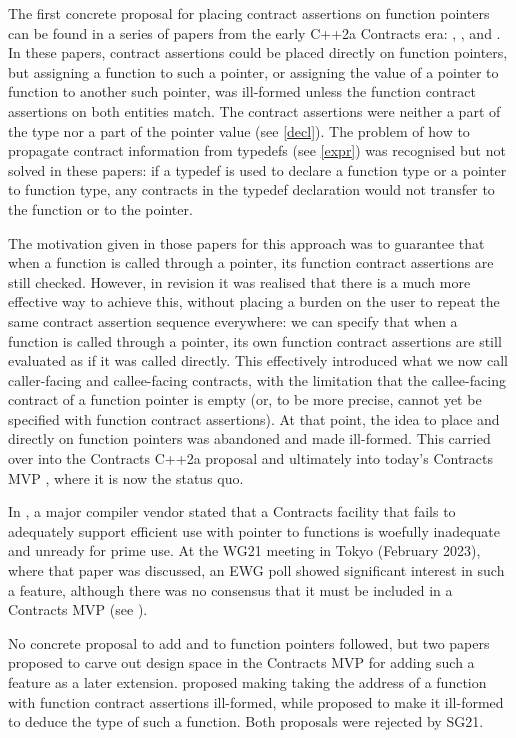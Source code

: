 The first concrete proposal for placing contract assertions on function pointers can be found in a series of papers from the early C++2a Contracts era: \cite{N4415}, \cite{P0287R0}, and \cite{P0380R0}. In these papers, contract assertions could be placed directly on function pointers, but assigning a function to such a pointer, or assigning the value of a pointer to function to another such pointer, was ill-formed unless the function contract assertions on both entities match. The contract assertions were neither a part of the type nor a part of the pointer value (see \ref{decl}). The problem of how to propagate contract information from typedefs (see \ref{expr}) was recognised but not solved in these papers:  if a typedef is used to declare a function type or a pointer to function type, any contracts in the typedef declaration would not transfer to the function or to the pointer.

The motivation given in those papers for this approach was to guarantee that when a function is called through a pointer, its function contract assertions are still checked. However, in revision \cite{P0380R1} it was realised that there is a much more effective way to achieve this, without placing a burden on the user to repeat the same contract assertion sequence everywhere: we can specify that when a function is called through a pointer, its own function contract assertions are still evaluated as if it was called directly. This effectively introduced what we now call caller-facing and callee-facing contracts, with the limitation that the callee-facing contract of a function pointer is empty (or, to be more precise, cannot yet be specified with function contract assertions). At that point, the idea to place  and  directly on function pointers was abandoned and made ill-formed. This carried over into the Contracts C++2a proposal \cite{P0542R5} and ultimately into today's Contracts MVP \cite{P2900R8}, where it is now the status quo.

In \cite{P3173R0}, a major compiler vendor stated that a Contracts facility that fails to adequately support efficient use with pointer to functions is woefully inadequate and unready for prime use. At the WG21 meeting in Tokyo (February 2023), where that paper was discussed, an EWG poll showed significant interest in such a feature, although there was no consensus that it must be included in a Contracts MVP (see \cite{P3197R0}).

No concrete proposal to add  and  to function pointers followed, but two papers proposed to carve out design space in the Contracts MVP for adding such a feature as a later extension. \cite{P3221R0} proposed making taking the address of a function with function contract assertions ill-formed, while \cite{P3250R0} proposed to make it ill-formed to deduce the type of such a function. Both proposals were rejected by SG21.

